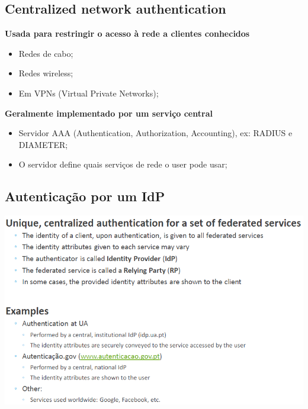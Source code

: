 \documentclass{article}
\begin{document}
\subsection{Centralized network authentication}

\begin{flushleft}
  \textbf{Usada para restringir o acesso à rede a clientes conhecidos}
  \begin{itemize}
    \item Redes de cabo;
    \item Redes wireless;
    \item Em VPNs (Virtual Private Networks);
  \end{itemize}

  \vspace{2mm}

  \textbf{Geralmente implementado por um serviço central}
  \begin{itemize}
    \item Servidor AAA (Authentication, Authorization, Accounting), ex: RADIUS e DIAMETER;
    \item O servidor define quais serviços de rede o user pode usar;
  \end{itemize}
\end{flushleft}

\pagebreak

\subsection{Autenticação por um IdP}

\begin{center}
  \includegraphics[scale=0.5]{27}
\end{center}
\end{document}
